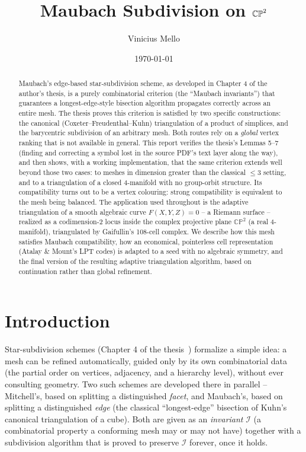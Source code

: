 \documentclass[11pt]{article}
\title{\bf Maubach Subdivision on $\CP^2$}
\author{Vinicius Mello}
\date{\today}
\newcommand{\CP}{\mathbb{CP}}
\begin{document}
\maketitle

\begin{abstract}
Maubach's edge-based star-subdivision scheme, as developed in Chapter 4 of
the author's thesis, is a purely combinatorial criterion (the ``Maubach
invariants'') that guarantees a longest-edge-style bisection algorithm
propagates correctly across an entire mesh. The thesis proves this
criterion is satisfied by two specific constructions: the canonical
(Coxeter--Freudenthal--Kuhn) triangulation of a product of simplices, and
the barycentric subdivision of an arbitrary mesh. Both routes rely on a
\emph{global} vertex ranking that is not available in general. This report
verifies the thesis's Lemmas 5--7 (finding and correcting a symbol lost in
the source PDF's text layer along the way), and then shows, with a working
implementation, that the same criterion extends well beyond those two
cases: to meshes in dimension greater than the classical $\le 3$ setting,
and to a triangulation of a closed $4$-manifold with no group-orbit
structure. Its compatibility turns out to be a vertex colouring:
strong compatibility is equivalent to the mesh being balanced. The
application used throughout is the adaptive triangulation of a smooth
algebraic curve $F(X,Y,Z)=0$ -- a Riemann surface -- realized as a
codimension-2 locus inside the complex projective plane $\CP^2$ (a real
4-manifold), triangulated by Gaifullin's 108-cell complex. We describe how
this mesh satisfies Maubach compatibility, how an economical, pointerless
cell representation (Atalay \& Mount's LPT codes) is adapted to a seed with
no algebraic symmetry, and the final version of the resulting adaptive
triangulation algorithm, based on continuation rather than global
refinement.
\end{abstract}

\tableofcontents

\section{Introduction}

Star-subdivision schemes (Chapter 4 of the thesis~\cite{mello2006})
formalize a simple idea:
a mesh can be refined automatically, guided only by its own combinatorial
data (the partial order on vertices, adjacency, and a hierarchy level),
without ever consulting geometry. Two such schemes are developed there in
parallel -- Mitchell's, based on splitting a distinguished \emph{facet},
and Maubach's, based on splitting a distinguished \emph{edge} (the
classical ``longest-edge'' bisection of Kuhn's canonical triangulation of a
cube). Both are given as an \emph{invariant} $\mathcal I$ (a combinatorial
property a conforming mesh may or may not have) together with a
subdivision algorithm that is proved to preserve $\mathcal I$ forever, once
it holds.
\end{document}
